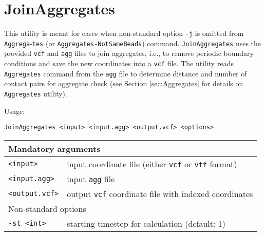 \section{JoinAggregates} \label{sec:JoinAggregates}

This utility is meant for cases when non-standard option \texttt{-j} is
omitted from \texttt{Aggrega}-\texttt{tes} (or \texttt{Aggregates-NotSameBeads})
command. \texttt{JoinAggregates} uses the provided \texttt{vcf} and
\texttt{agg} files to join aggregates, i.e., to remove periodic boundary
conditions and save the new coordinates into a \texttt{vcf} file. The
utility reads \texttt{Aggregates} command from the \texttt{agg} file to
determine distance and number of contact pairs for aggregate check (see
Section \ref{sec:Aggregates} for details on \texttt{Aggregates} utility).

Usage:

\vspace{1em}
\noindent
\texttt{JoinAggregates <input> <input.agg> <output.vcf> <options>}

\vspace{1em}
\noindent
\begin{longtable}{p{}p{}}
  \toprule
  \multicolumn{2}{l}{Mandatory arguments} \\
  \midrule
  \texttt{<input>} & input coordinate file (either \texttt{vcf} or
    \texttt{vtf} format) \\
  \texttt{<input.agg>} & input \texttt{agg} file \\
  \texttt{<output.vcf>} & output \texttt{vcf} coordinate file with indexed
    coordinates \\
  \toprule
  \multicolumn{2}{l}{Non-standard options} \\
  \midrule
  \texttt{-st <int>} & starting timestep for calculation (default: 1) \\
  \bottomrule
\end{longtable}
